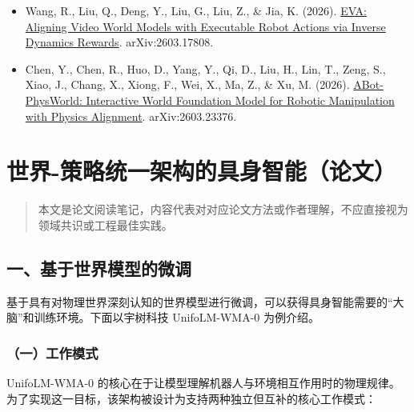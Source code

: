 \begin{itemize}
\tightlist
\item
  Wang, R., Liu, Q., Deng, Y., Liu, G., Liu, Z., \& Jia, K. (2026). \href{https://arxiv.org/abs/2603.17808}{EVA: Aligning Video World Models with Executable Robot Actions via Inverse Dynamics Rewards}. arXiv:2603.17808.
\item
  Chen, Y., Chen, R., Huo, D., Yang, Y., Qi, D., Liu, H., Lin, T., Zeng, S., Xiao, J., Chang, X., Xiong, F., Wei, X., Ma, Z., \& Xu, M. (2026). \href{https://arxiv.org/abs/2603.23376}{ABot-PhysWorld: Interactive World Foundation Model for Robotic Manipulation with Physics Alignment}. arXiv:2603.23376.
\end{itemize}

\clearpage

\hypertarget{ux4e16ux754c-ux7b56ux7565ux7edfux4e00ux67b6ux6784ux7684ux5177ux8eabux667aux80fdux8bbaux6587}{%
\section{世界-策略统一架构的具身智能（论文）}\label{ux4e16ux754c-ux7b56ux7565ux7edfux4e00ux67b6ux6784ux7684ux5177ux8eabux667aux80fdux8bbaux6587}}

\begin{quote}
本文是论文阅读笔记，内容代表对对应论文方法或作者理解，不应直接视为领域共识或工程最佳实践。
\end{quote}

\hypertarget{ux4e00ux57faux4e8eux4e16ux754cux6a21ux578bux7684ux5faeux8c03}{%
\subsection{一、基于世界模型的微调}\label{ux4e00ux57faux4e8eux4e16ux754cux6a21ux578bux7684ux5faeux8c03}}

基于具有对物理世界深刻认知的世界模型进行微调，可以获得具身智能需要的``大脑''和训练环境。下面以宇树科技 UnifoLM-WMA-0 为例介绍。

\hypertarget{ux4e00ux5de5ux4f5cux6a21ux5f0f}{%
\subsubsection{（一）工作模式}\label{ux4e00ux5de5ux4f5cux6a21ux5f0f}}

UnifoLM-WMA-0 的核心在于让模型理解机器人与环境相互作用时的物理规律。为了实现这一目标，该架构被设计为支持两种独立但互补的核心工作模式：

